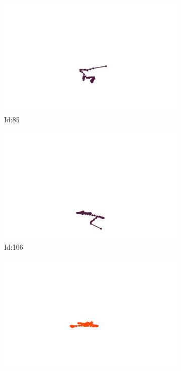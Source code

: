 \documentclass[12pt,twoside]{report}
\begin{document}
\begin{figure}
\centering
\begin{subfigure}[b]{0.20\textwidth}
\centering
\includegraphics[width=\textwidth]{../../trajectories/85.png}
\caption{Id:85}
\end{subfigure}
\begin{subfigure}[b]{0.20\textwidth}
\centering
\includegraphics[width=\textwidth]{../../trajectories/106.png}
\caption{Id:106}
\end{subfigure}
\begin{subfigure}[b]{0.20\textwidth}
\centering
\includegraphics[width=\textwidth]{../../trajectories/174.png}

\end{subfigure}
\end{figure}
\end{document}
